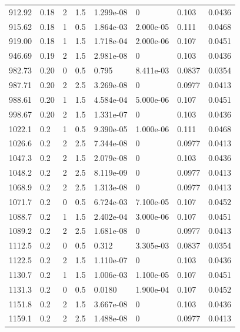 \documentclass[preview]{standalone}
\begin{document}
{{{\begin{tabular}{L{1.2cm}C{1.2cm} C{0.3cm}C{0.5cm} C{1.4cm}C{1.4cm} C{1.4cm}C{1.4cm}}
  912.92  &  0.18  & 2     & 1.5 &  1.299e-08  & 0  & 0.103 &  0.0436   \\ 
  915.62  &  0.18  & 1     & 0.5 &  1.864e-03  & 2.000e-05  & 0.111 &  0.0468   \\ 
  919.00  &  0.18  & 1     & 1.5 &  1.718e-04  & 2.000e-06  & 0.107 &  0.0451   \\ 
  946.69  &  0.19  & 2     & 1.5 &  2.981e-08  & 0  & 0.103 &  0.0436   \\ 
  982.73  &  0.20  & 0     & 0.5 &  0.795  & 8.411e-03  & 0.0837 &  0.0354   \\ 
  987.71  &  0.20  & 2     & 2.5 &  3.269e-08  & 0  & 0.0977 &  0.0413   \\ 
  988.61  &  0.20  & 1     & 1.5 &  4.584e-04  & 5.000e-06  & 0.107 &  0.0451   \\ 
  998.67  &  0.20  & 2     & 1.5 &  1.331e-07  & 0  & 0.103 &  0.0436   \\ 
  1022.1  &   0.2  & 1     & 0.5 &  9.390e-05  & 1.000e-06  & 0.111 &  0.0468   \\ 
  1026.6  &   0.2  & 2     & 2.5 &  7.344e-08  & 0  & 0.0977 &  0.0413   \\ 
  1047.3  &   0.2  & 2     & 1.5 &  2.079e-08  & 0  & 0.103 &  0.0436   \\ 
  1048.2  &   0.2  & 2     & 2.5 &  8.119e-09  & 0  & 0.0977 &  0.0413   \\ 
  1068.9  &   0.2  & 2     & 2.5 &  1.313e-08  & 0  & 0.0977 &  0.0413   \\ 
  1071.7  &   0.2  & 0     & 0.5 &  6.724e-03  & 7.100e-05  & 0.107 &  0.0452   \\ 
  1088.7  &   0.2  & 1     & 1.5 &  2.402e-04  & 3.000e-06  & 0.107 &  0.0451   \\ 
  1089.2  &   0.2  & 2     & 2.5 &  1.681e-08  & 0  & 0.0977 &  0.0413   \\ 
  1112.5  &   0.2  & 0     & 0.5 &  0.312  & 3.305e-03  & 0.0837 &  0.0354   \\ 
  1122.5  &   0.2  & 2     & 1.5 &  1.110e-07  & 0  & 0.103 &  0.0436   \\ 
  1130.7  &   0.2  & 1     & 1.5 &  1.006e-03  & 1.100e-05  & 0.107 &  0.0451   \\ 
  1131.3  &   0.2  & 0     & 0.5 &  0.0180  & 1.900e-04  & 0.107 &  0.0452   \\ 
  1151.8  &   0.2  & 2     & 1.5 &  3.667e-08  & 0  & 0.103 &  0.0436   \\ 
  1159.1  &   0.2  & 2     & 2.5 &  1.488e-08  & 0  & 0.0977 &  0.0413   \\ 

\end{tabular}}}}
\end{document}
